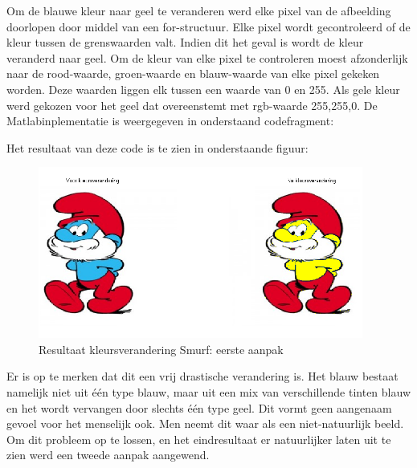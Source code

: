 			\newpage
			\par Om de blauwe kleur naar geel te veranderen werd elke pixel van de afbeelding doorlopen door middel van een for-structuur.
			Elke pixel wordt gecontroleerd of de kleur tussen de grenswaarden valt. Indien dit het geval is wordt de kleur veranderd naar geel.
			Om de kleur van elke pixel te controleren moest afzonderlijk naar de rood-waarde, groen-waarde en blauw-waarde van elke pixel gekeken worden.
			Deze waarden liggen elk tussen een waarde van 0 en 255. Als gele kleur werd gekozen voor het geel dat overeenstemt met rgb-waarde 255,255,0. 
			De Matlabinplementatie is weergegeven in onderstaand codefragment:\bigskip			
			
			
			
			\newpage
			
			\par Het resultaat van deze code is te zien in onderstaande figuur: 
			
				\begin{figure}[H]
				\centering
				\includegraphics[width=0.95\textwidth]{Images/resultaat_smurf_1.png}
				\caption{Resultaat kleursverandering Smurf: eerste aanpak}
				\label{fig:smurf_eerste_aanpak}
				\end{figure}
			
			\par Er is op te merken dat dit een vrij drastische verandering is. Het blauw bestaat namelijk niet uit \'e\'en type blauw, maar uit een mix van
			verschillende tinten blauw en het wordt vervangen door slechts \'e\'en type geel. Dit vormt geen aangenaam gevoel voor het menselijk ook. Men neemt 
			dit waar als een niet-natuurlijk beeld. Om dit probleem op te lossen, en het eindresultaat er natuurlijker laten uit te zien werd een tweede aanpak 
			aangewend.	
				

